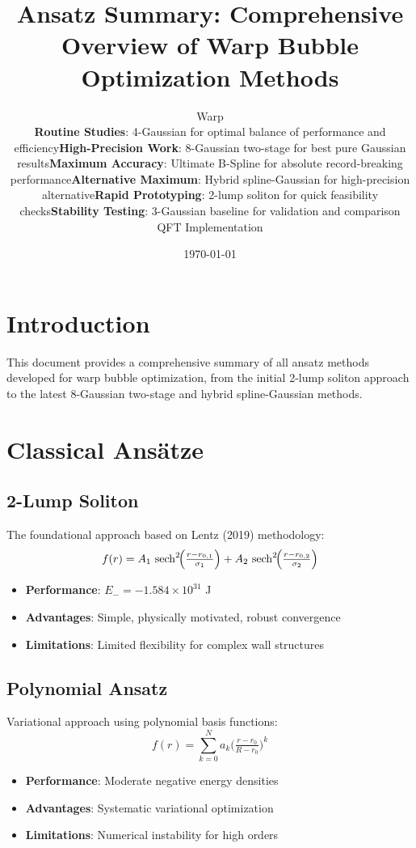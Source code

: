 \documentclass[12pt]{article}
\title{Ansatz Summary: Comprehensive Overview of Warp Bubble Optimization Methods}
\author{Warp \begin{itemize}
\item \textbf{Routine Studies}: 4-Gaussian for optimal balance of performance and efficiency
\item \textbf{High-Precision Work}: 8-Gaussian two-stage for best pure Gaussian results
\item \textbf{Maximum Accuracy}: Ultimate B-Spline for absolute record-breaking performance
\item \textbf{Alternative Maximum}: Hybrid spline-Gaussian for high-precision alternative
\item \textbf{Rapid Prototyping}: 2-lump soliton for quick feasibility checks
\item \textbf{Stability Testing}: 3-Gaussian baseline for validation and comparison
\end{itemize}QFT Implementation}
\date{\today}
\begin{document}
\maketitle

\section{Introduction}

This document provides a comprehensive summary of all ansatz methods developed for warp bubble optimization, from the initial 2-lump soliton approach to the latest 8-Gaussian two-stage and hybrid spline-Gaussian methods.

\section{Classical Ansätze}

\subsection{2-Lump Soliton}
The foundational approach based on Lentz (2019) methodology:
\[
  f(r) = A_1 \,\sech^2\!\Bigl(\tfrac{r - r_{0,1}}{\sigma_1}\Bigr) + A_2 \,\sech^2\!\Bigl(\tfrac{r - r_{0,2}}{\sigma_2}\Bigr)
\]

\begin{itemize}
\item \textbf{Performance}: $E_- = -1.584\times10^{31}$ J
\item \textbf{Advantages}: Simple, physically motivated, robust convergence
\item \textbf{Limitations}: Limited flexibility for complex wall structures
\end{itemize}

\subsection{Polynomial Ansatz}
Variational approach using polynomial basis functions:
\[
  f(r) = \sum_{k=0}^N a_k \bigl(\tfrac{r - r_0}{R - r_0}\bigr)^k
\]

\begin{itemize}
\item \textbf{Performance}: Moderate negative energy densities
\item \textbf{Advantages}: Systematic variational optimization
\item \textbf{Limitations}: Numerical instability for high orders
\end{itemize}
\end{document}

